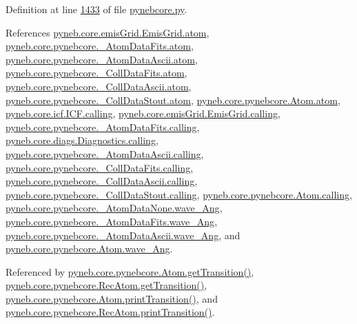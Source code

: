 Definition at line \hyperlink{pynebcore_8py_source_l01433}{1433} of file \hyperlink{pynebcore_8py_source}{pynebcore.\-py}.



References \hyperlink{emis_grid_8py_source_l00051}{pyneb.\-core.\-emis\-Grid.\-Emis\-Grid.\-atom}, \hyperlink{pynebcore_8py_source_l00089}{pyneb.\-core.\-pynebcore.\-\_\-\-Atom\-Data\-Fits.\-atom}, \hyperlink{pynebcore_8py_source_l00310}{pyneb.\-core.\-pynebcore.\-\_\-\-Atom\-Data\-Ascii.\-atom}, \hyperlink{pynebcore_8py_source_l00576}{pyneb.\-core.\-pynebcore.\-\_\-\-Coll\-Data\-Fits.\-atom}, \hyperlink{pynebcore_8py_source_l00926}{pyneb.\-core.\-pynebcore.\-\_\-\-Coll\-Data\-Ascii.\-atom}, \hyperlink{pynebcore_8py_source_l01162}{pyneb.\-core.\-pynebcore.\-\_\-\-Coll\-Data\-Stout.\-atom}, \hyperlink{pynebcore_8py_source_l01218}{pyneb.\-core.\-pynebcore.\-Atom.\-atom}, \hyperlink{icf_8py_source_l00016}{pyneb.\-core.\-icf.\-I\-C\-F.\-calling}, \hyperlink{emis_grid_8py_source_l00044}{pyneb.\-core.\-emis\-Grid.\-Emis\-Grid.\-calling}, \hyperlink{pynebcore_8py_source_l00097}{pyneb.\-core.\-pynebcore.\-\_\-\-Atom\-Data\-Fits.\-calling}, \hyperlink{diags_8py_source_l00169}{pyneb.\-core.\-diags.\-Diagnostics.\-calling}, \hyperlink{pynebcore_8py_source_l00318}{pyneb.\-core.\-pynebcore.\-\_\-\-Atom\-Data\-Ascii.\-calling}, \hyperlink{pynebcore_8py_source_l00585}{pyneb.\-core.\-pynebcore.\-\_\-\-Coll\-Data\-Fits.\-calling}, \hyperlink{pynebcore_8py_source_l00936}{pyneb.\-core.\-pynebcore.\-\_\-\-Coll\-Data\-Ascii.\-calling}, \hyperlink{pynebcore_8py_source_l01156}{pyneb.\-core.\-pynebcore.\-\_\-\-Coll\-Data\-Stout.\-calling}, \hyperlink{pynebcore_8py_source_l01229}{pyneb.\-core.\-pynebcore.\-Atom.\-calling}, \hyperlink{pynebcore_8py_source_l00064}{pyneb.\-core.\-pynebcore.\-\_\-\-Atom\-Data\-None.\-wave\-\_\-\-Ang}, \hyperlink{pynebcore_8py_source_l00172}{pyneb.\-core.\-pynebcore.\-\_\-\-Atom\-Data\-Fits.\-wave\-\_\-\-Ang}, \hyperlink{pynebcore_8py_source_l00438}{pyneb.\-core.\-pynebcore.\-\_\-\-Atom\-Data\-Ascii.\-wave\-\_\-\-Ang}, and \hyperlink{pynebcore_8py_source_l01254}{pyneb.\-core.\-pynebcore.\-Atom.\-wave\-\_\-\-Ang}.



Referenced by \hyperlink{pynebcore_8py_source_l01472}{pyneb.\-core.\-pynebcore.\-Atom.\-get\-Transition()}, \hyperlink{pynebcore_8py_source_l02872}{pyneb.\-core.\-pynebcore.\-Rec\-Atom.\-get\-Transition()}, \hyperlink{pynebcore_8py_source_l01491}{pyneb.\-core.\-pynebcore.\-Atom.\-print\-Transition()}, and \hyperlink{pynebcore_8py_source_l02891}{pyneb.\-core.\-pynebcore.\-Rec\-Atom.\-print\-Transition()}.



